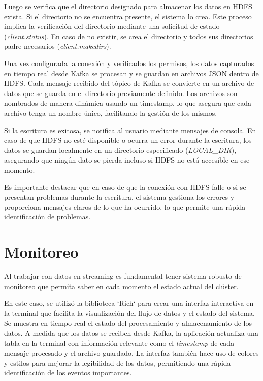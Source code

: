 \documentclass{article}
\begin{document}
Luego se verifica que el directorio designado para almacenar los datos en HDFS exista. Si el directorio no se encuentra presente, el sistema lo crea. Este proceso implica la verificación del directorio mediante una solicitud de estado (\textit{client.status}). En caso de no existir, se crea el directorio y todos sus directorios padre necesarios (\textit{client.makedirs}).

Una vez configurada la conexión y verificados los permisos, los datos capturados en tiempo real desde Kafka se procesan y se guardan en archivos JSON dentro de HDFS. Cada mensaje recibido del tópico de Kafka se convierte en un archivo de datos que se guarda en el directorio previamente definido. Los archivos son nombrados de manera dinámica usando un timestamp, lo que asegura que cada archivo tenga un nombre único, facilitando la gestión de los mismos.

Si la escritura es exitosa, se notifica al usuario mediante mensajes de consola. En caso de que HDFS no esté disponible o ocurra un error durante la escritura, los datos se guardan localmente en un directorio especificado (\textit{LOCAL\_DIR}), asegurando que ningún dato se pierda incluso si HDFS no está accesible en ese momento.

Es importante destacar que en caso de que la conexión con HDFS falle o si se presentan problemas durante la escritura, el sistema gestiona los errores y proporciona mensajes claros de lo que ha ocurrido, lo que permite una rápida identificación de problemas.

\section{Monitoreo}

Al trabajar con datos en streaming es fundamental tener sistema robusto de monitoreo que permita saber en cada momento el estado actual del clúster.

En este caso, se utilizó la biblioteca `Rich` para crear una interfaz interactiva en la terminal que facilita la visualización del flujo de datos y el estado del sistema.
Se muestra en tiempo real el estado del procesamiento y almacenamiento de los datos. A medida que los datos se reciben desde Kafka, la aplicación actualiza una tabla en la terminal con información relevante como el \textit{timestamp} de cada mensaje procesado y el archivo guardado. La interfaz también hace uso de colores y estilos para mejorar la legibilidad de los datos, permitiendo una rápida identificación de los eventos importantes.
\end{document}
